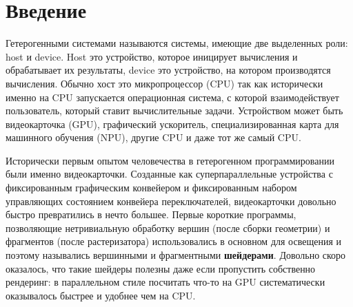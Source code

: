 \chapter*{Введение}                         %

Гетерогенными системами называются системы, имеющие две выделенных роли: host и device. Host это устройство, которое иницирует вычисления и обрабатывает их результаты, device это устройство, на котором производятся вычисления. Обычно хост это микропроцессор (CPU)
так как исторически именно на CPU запускается операционная система, с которой взаимодействует пользователь, который ставит вычислительные задачи. Устройством может быть видеокарточка (GPU), графический ускоритель, специализированная карта для машинного обучения (NPU), другие CPU и даже тот же самый CPU.

Исторически первым опытом человечества в гетерогенном программировании были именно видеокарточки.
Созданные как суперпараллельные устройства с фиксированным графическим конвейером и фиксированным набором управляющих состоянием конвейера переключателей, видеокарточки довольно быстро превратились в нечто большее.
Первые короткие программы, позволяющие нетривиальную обработку вершин (после сборки геометрии) и фрагментов (после растеризатора) использовались в основном для освещения и поэтому назывались вершинными и фрагментными \textbf{шейдерами}. Довольно скоро оказалось, что такие шейдеры полезны даже если пропустить собственно рендеринг: в параллельном стиле посчитать что-то на GPU систематически оказывалось быстрее и удобнее чем на CPU.

